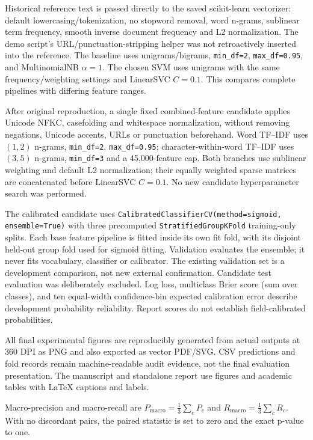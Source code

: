 Historical reference text is passed directly to the saved scikit-learn vectorizer: default lowercasing/tokenization, no stopword removal, word n-grams, sublinear term frequency, smooth inverse document frequency and L2 normalization. The demo script's URL/punctuation-stripping helper was not retroactively inserted into the reference. The baseline uses unigrams/bigrams, \texttt{min\_df=2}, \texttt{max\_df=0.95}, and MultinomialNB $\alpha=1$. The chosen SVM uses unigrams with the same frequency/weighting settings and LinearSVC $C=0.1$. This compares complete pipelines with differing feature ranges.

After original reproduction, a single fixed combined-feature candidate applies Unicode NFKC, casefolding and whitespace normalization, without removing negations, Unicode accents, URLs or punctuation beforehand. Word TF--IDF uses $(1,2)$ n-grams, \texttt{min\_df=2}, \texttt{max\_df=0.95}; character-within-word TF--IDF uses $(3,5)$ n-grams, \texttt{min\_df=3} and a 45,000-feature cap. Both branches use sublinear weighting and default L2 normalization; their equally weighted sparse matrices are concatenated before LinearSVC $C=0.1$. No new candidate hyperparameter search was performed.

The calibrated candidate uses \texttt{CalibratedClassifierCV(method=sigmoid, ensemble=True)} with three precomputed \texttt{StratifiedGroupKFold} training-only splits. Each base feature pipeline is fitted inside its own fit fold, with its disjoint held-out group fold used for sigmoid fitting. Validation evaluates the ensemble; it never fits vocabulary, classifier or calibrator. The existing validation set is a development comparison, not new external confirmation. Candidate test evaluation was deliberately excluded. Log loss, multiclass Brier score (sum over classes), and ten equal-width confidence-bin expected calibration error describe development probability reliability. Report scores do not establish field-calibrated probabilities.

All final experimental figures are reproducibly generated from actual outputs at 360 DPI as PNG and also exported as vector PDF/SVG. CSV predictions and fold records remain machine-readable audit evidence, not the final evaluation presentation. The manuscript and standalone report use figures and academic tables with LaTeX captions and labels.
\par Macro-precision and macro-recall are $P_{\mathrm{macro}}=\frac{1}{3}\sum_c P_c$ and $R_{\mathrm{macro}}=\frac{1}{3}\sum_c R_c$. With no discordant pairs, the paired statistic is set to zero and the exact p-value to one.
